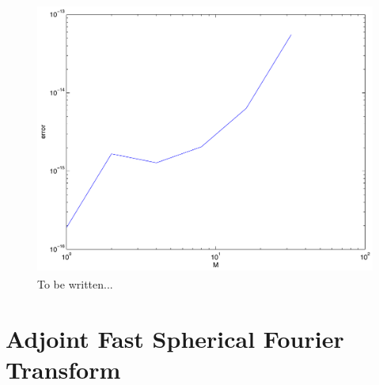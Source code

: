 \begin{figure}[tb]
  \centering
  \includegraphics[height=9cm,width=12cm]{images/accuracy}
  \caption{To be written...}
  \label{NFSFT:Figure:Accuracy}
\end{figure}


\section{Adjoint Fast Spherical Fourier Transform}
\label{DSFT:AdjointTransform}
